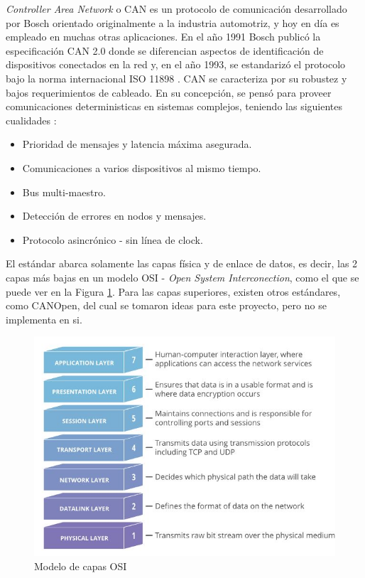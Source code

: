 \textit{Controller Area Network} o CAN es un protocolo de comunicación desarrollado por Bosch \citep{wikipedia_CAN} orientado originalmente a la industria automotriz, y hoy en día es empleado en muchas otras aplicaciones. En el año 1991 Bosch publicó la especificación CAN 2.0 donde se diferencian aspectos de identificación de dispositivos conectados en la red y, en el año 1993, se estandarizó el protocolo bajo la norma internacional ISO 11898 \citep{web_ISO_CAN}.
CAN se caracteriza por su robustez y bajos requerimientos de cableado. En su concepción, se pensó para proveer comunicaciones deterministicas en sistemas complejos, teniendo las siguientes cualidades \citep{Understanding_CAN}:
\begin{itemize}
	\item Prioridad de mensajes y latencia máxima asegurada.
	\item Comunicaciones a varios dispositivos al mismo tiempo.	
	\item Bus multi-maestro.
	\item Detección de errores en nodos y mensajes.
	\item Protocolo asincrónico - sin línea de clock.
\end{itemize}
El estándar abarca solamente las capas física y de enlace de datos, es decir, las 2 capas más bajas en un modelo OSI - \textit{Open System Interconection}, como el que se puede ver en la Figura \ref{fig:modeloOsi}. Para las capas superiores, existen otros estándares, como CANOpen\protect\footnotemark, del cual se tomaron ideas para este proyecto, pero no se implementa en si.

\begin{figure}[htbp]
	\centering
	\includegraphics[scale=.8]{./Figures/OSI_model.JPG}
	\caption{Modelo de capas OSI\protect\footnotemark}
	\label{fig:modeloOsi}
\end{figure}

